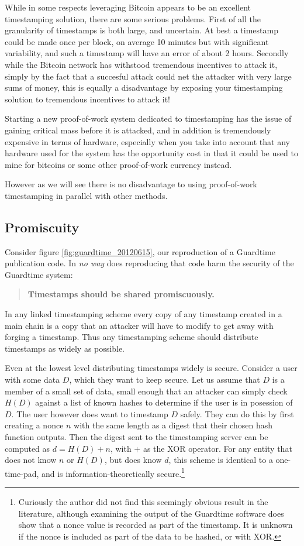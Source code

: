 \documentclass{article}
\begin{document}
While in some respects leveraging Bitcoin appears to be an excellent
timestamping solution, there are some serious problems. First of all the
granularity of timestamps is both large, and uncertain. At best a timestamp
could be made once per block, on average 10 minutes but with significant
variability, and such a timestamp will have an error of about 2 hours. Secondly
while the Bitcoin network has withstood tremendous incentives to attack it,
simply by the fact that a succesful attack could net the attacker with very
large sums of money, this is equally a disadvantage by exposing your
timestamping solution to tremendous incentives to attack it!

Starting a new proof-of-work system dedicated to timestamping has the issue of
gaining critical mass before it is attacked, and in addition is tremendously
expensive in terms of hardware, especially when you take into account that any
hardware used for the system has the opportunity cost in that it could be used
to mine for bitcoins or some other proof-of-work currency instead.

However as we will see there is no disadvantage to using proof-of-work
timestamping in parallel with other methods.

\subsection{Promiscuity}

Consider figure \ref{fig:guardtime_20120615}, our reproduction of a Guardtime
publication code. In \emph{no way} does reproducing that code harm the security
of the Guardtime system:

\begin{quote}
    \centering
    \textbf{Timestamps should be shared promiscuously.}
\end{quote}

In any linked timestamping scheme every copy of any timestamp created in a main
chain is a copy that an attacker will have to modify to get away with forging a
timestamp. Thus any timestamping scheme should distribute timestamps as widely
as possible.

Even at the lowest level distributing timestamps widely is secure. Consider a
user with some data $D$, which they want to keep secure. Let us assume that $D$
is a member of a small set of data, small enough that an attacker can simply
check $H(D)$ against a list of known hashes to determine if the user is in
posession of $D$. The user however does want to timestamp $D$ safely. They can
do this by first creating a nonce $n$ with the same length as a digest that
their chosen hash function outputs. Then the digest sent to the timestamping
server can be computed as $d=H(D)+n$, with $+$ as the XOR operator. For any
entity that does not know $n$ or $H(D)$, but does know $d$, this scheme is
identical to a one-time-pad, and is information-theoretically
secure.\footnote{Curiously the author did not find this seemingly obvious
result in the literature, although examining the output of the Guardtime
software does show that a nonce value is recorded as part of the timestamp.
It is unknown if the nonce is included as part of the data to be hashed, or
with XOR.}
\end{document}

